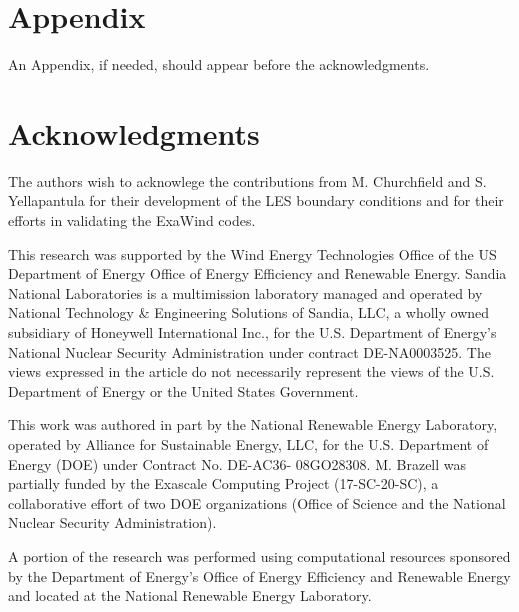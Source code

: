 \documentclass[conf]{new-aiaa}
\begin{document}
\section*{Appendix}

An Appendix, if needed, should appear before the acknowledgments.

\section*{Acknowledgments}

The authors wish to acknowlege the contributions from M. Churchfield
and S. Yellapantula for their development of the LES boundary
conditions and for their efforts in validating the ExaWind codes.

This research was supported by the Wind Energy Technologies Office of
the US Department of Energy Office of Energy Efficiency and Renewable
Energy.  Sandia National Laboratories is a multimission laboratory
managed and operated by National Technology \& Engineering Solutions
of Sandia, LLC, a wholly owned subsidiary of Honeywell International
Inc., for the U.S. Department of Energy's National Nuclear Security
Administration under contract DE-NA0003525. The views expressed in the
article do not necessarily represent the views of the U.S. Department
of Energy or the United States Government.

This work was authored in part by the National Renewable Energy
Laboratory, operated by Alliance for Sustainable Energy, LLC, for the
U.S. Department of Energy (DOE) under Contract No. DE-AC36-
08GO28308. M. Brazell was partially funded by the Exascale Computing
Project (17-SC-20-SC), a collaborative effort of two DOE organizations
(Office of Science and the National Nuclear Security Administration).

A portion of the research was performed using computational
resources sponsored by the Department of Energy's Office of Energy
Efficiency and Renewable Energy and located at the National Renewable
Energy Laboratory.


\end{document}
